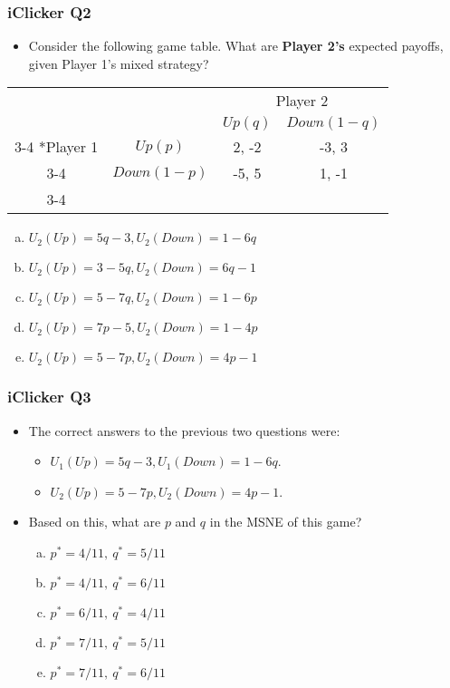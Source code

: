 \begin{frame}
\frametitle{iClicker Q2}
\begin{itemize}
\item Consider the following game table. What are \textbf{Player 2's} expected payoffs, given Player 1's mixed strategy?
\end{itemize}
\begin{table}[h]
\centering
\begin{tabular}{cc|c|c|}
& \multicolumn{1}{c}{} & \multicolumn{2}{c}{Player 2}\\
& \multicolumn{1}{c}{} & \multicolumn{1}{c}{$Up (q)$}  & \multicolumn{1}{c}{$Down (1 - q)$} \\\cline{3-4}
\multirow{2}*{Player 1}  & $Up (p)$ & 2, -2 & -3, 3 \\\cline{3-4}
& $Down (1 - p)$ & -5, 5 & 1, -1 \\\cline{3-4}
\end{tabular}
\end{table}
\begin{enumerate}[(a)]
\item $U_2(Up) = 5q - 3, U_2(Down) = 1 - 6q$
\item $U_2(Up) = 3 - 5q, U_2(Down) = 6q - 1$
\item $U_2(Up) = 5 - 7q, U_2(Down) = 1 - 6p$
\item $U_2(Up) = 7p - 5, U_2(Down) = 1 - 4p$
\item $U_2(Up) = 5 - 7p, U_2(Down) = 4p - 1$
\end{enumerate}
\end{frame}


\begin{frame}
\frametitle{iClicker Q3}
\begin{itemize}
\item The correct answers to the previous two questions were:
\begin{itemize}
\item $U_1(Up) = 5q - 3, U_1(Down) = 1 - 6q$.
\item $U_2(Up) = 5 - 7p, U_2(Down) = 4p - 1$.
\end{itemize}
\item Based on this, what are $p$ and $q$ in the MSNE of this game?
\begin{enumerate}[(a)]
\item $p^* = 4/11, \ q^* = 5/11$
\item $p^* = 4/11, \ q^* = 6/11$
\item $p^* = 6/11, \ q^* = 4/11$
\item $p^* = 7/11, \ q^* = 5/11$
\item $p^* = 7/11, \ q^* = 6/11$
\end{enumerate}
\end{itemize}
\end{frame}

